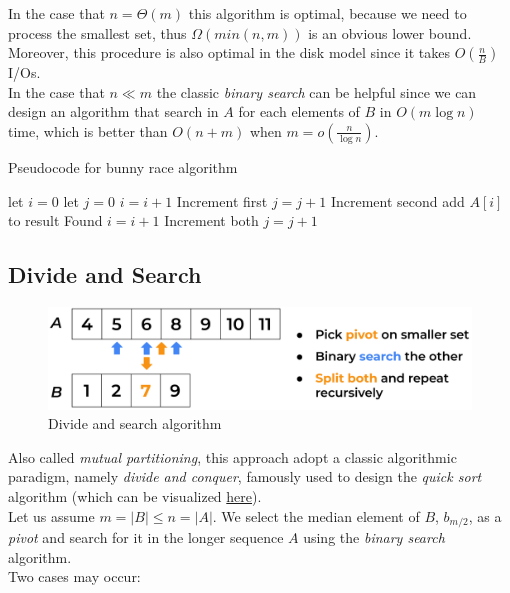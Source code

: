 In the case that $n=\Theta (m)$ this algorithm is optimal, because we need to process the smallest set, thus $\Omega(min(n,m))$ is an obvious lower bound. Moreover, this procedure is also optimal in the disk model since it takes $O \left(\frac{n}{B}\right)$ I/Os. \\
In the case that $n \ll m$ the classic \textit{binary search} can be helpful since we can design an algorithm that search in $A$ for each elements of $B$ in $O(m \log n)$ time, which is better than $O(n+m)$ when $m=o\left(\frac{n}{\log n}\right)$.

\begin{algorithm}
    \captionsetup{labelsep=newline}
    \caption{Pseudocode for bunny race algorithm \label{alg:bunnyrace}}
    \begin{algorithmic}[1]
        \State let $i=0$ 
        \State let $j=0$ 
                \State $i=i+1$ \Comment Increment first
                \State $j=j+1$ \Comment Increment second
            \Else
                \State add $A[i]$ to result \Comment Found
                \State $i=i+1$  \Comment Increment both
                \State $j=j+1$
            \EndIf
        \EndWhile
    \end{algorithmic}
\end{algorithm}

\subsection{Divide and Search \label{sec:divandsearch}}

\begin{figure}[H] 
    \begin{center}
        \includegraphics[width=.8\textwidth]{imgs/divide_and_search.png}
        \caption{Divide and search algorithm \label{fig:divandsearch}}
    \end{center}
\end{figure}

Also called \textit{mutual partitioning}, this approach adopt a classic algorithmic paradigm, namely \textit{divide and conquer}, famously used to design the \textit{quick sort} algorithm (which can be visualized \href{https://en.wikipedia.org/wiki/Quicksort}{here}).\\
Let us assume $m=|B| \leq n=|A|$. We select the median element of $B$, $b_{m/2}$, as a \textit{pivot} and search for it in the longer sequence $A$ using the \textit{binary search}  algorithm.\\
Two cases may occur: 

